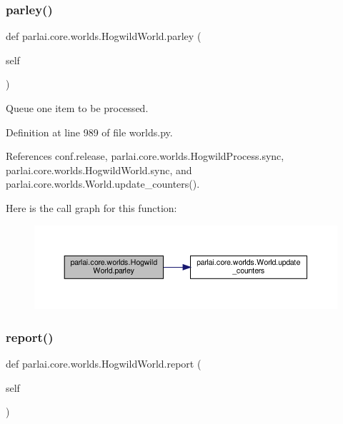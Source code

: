 \subsubsection{\texorpdfstring{parley()}{parley()}}
{\footnotesize\ttfamily def parlai.\+core.\+worlds.\+Hogwild\+World.\+parley (\begin{DoxyParamCaption}\item[{}]{self }\end{DoxyParamCaption})}

\begin{DoxyVerb}Queue one item to be processed.\end{DoxyVerb}
 

Definition at line 989 of file worlds.\+py.



References conf.\+release, parlai.\+core.\+worlds.\+Hogwild\+Process.\+sync, parlai.\+core.\+worlds.\+Hogwild\+World.\+sync, and parlai.\+core.\+worlds.\+World.\+update\+\_\+counters().

Here is the call graph for this function\+:
\nopagebreak
\begin{figure}[H]
\begin{center}
\leavevmode
\includegraphics[width=350pt]{classparlai_1_1core_1_1worlds_1_1HogwildWorld_a9853e25a58444d4516c3f6da8c44d9c2_cgraph}
\end{center}
\end{figure}
\mbox{\label{classparlai_1_1core_1_1worlds_1_1HogwildWorld_a11c6831feb2a54a0d9513b4a514d4097}} 
\subsubsection{\texorpdfstring{report()}{report()}}
{\footnotesize\ttfamily def parlai.\+core.\+worlds.\+Hogwild\+World.\+report (\begin{DoxyParamCaption}\item[{}]{self }\end{DoxyParamCaption})}

